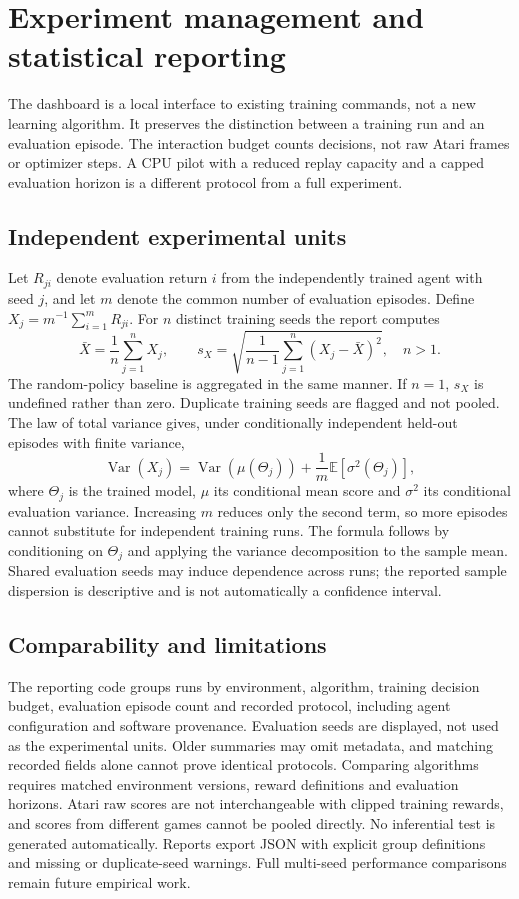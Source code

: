 \documentclass[11pt,a4paper]{article}
\begin{document}
\section{Experiment management and statistical reporting}
The dashboard is a local interface to existing training commands, not a new
learning algorithm. It preserves the distinction between a training run and an
evaluation episode. The interaction budget counts decisions, not raw Atari
frames or optimizer steps. A CPU pilot with a reduced replay capacity and a
capped evaluation horizon is a different protocol from a full experiment.

\subsection{Independent experimental units}
Let $R_{ji}$ denote evaluation return $i$ from the independently trained agent
with seed $j$, and let $m$ denote the common number of evaluation episodes.
Define $X_j=m^{-1}\sum_{i=1}^m R_{ji}$. For $n$ distinct training seeds the
report computes
\[
 \bar X=\frac1n\sum_{j=1}^n X_j,\qquad
 s_X=\sqrt{\frac{1}{n-1}\sum_{j=1}^n(X_j-\bar X)^2},\quad n>1.
\]
The random-policy baseline is aggregated in the same manner. If $n=1$,
$s_X$ is undefined rather than zero. Duplicate training seeds are flagged and
not pooled. The law of total variance gives, under conditionally independent
held-out episodes with finite variance,
\[
 \operatorname{Var}(X_j)=\operatorname{Var}(\mu(\Theta_j))+
 \frac1m\mathbb E[\sigma^2(\Theta_j)],
\]
where $\Theta_j$ is the trained model, $\mu$ its conditional mean score and
$\sigma^2$ its conditional evaluation variance. Increasing $m$ reduces only
the second term, so more episodes cannot substitute for independent training
runs. The formula follows by conditioning on $\Theta_j$ and applying the
variance decomposition to the sample mean. Shared evaluation seeds may induce
dependence across runs; the reported sample dispersion is descriptive and is
not automatically a confidence interval.

\subsection{Comparability and limitations}
The reporting code groups runs by environment, algorithm, training decision
budget, evaluation episode count and recorded protocol, including agent
configuration and software provenance. Evaluation seeds are displayed, not
used as the experimental units. Older summaries may omit metadata, and
matching recorded fields alone cannot prove identical protocols. Comparing
algorithms requires matched environment versions, reward definitions and
evaluation horizons. Atari raw scores are not interchangeable with clipped
training rewards, and scores from different games cannot be pooled directly.
No inferential test is generated automatically. Reports export JSON with
explicit group definitions and missing or duplicate-seed warnings. Full
multi-seed performance comparisons remain future empirical work.
\end{document}
